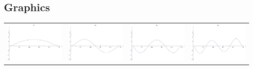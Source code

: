 \documentclass{article}
\begin{document}
\begin{landscape}
\subsection{Graphics}
\begin{tabular}{cccc}
\includegraphics[width=5.0cm]{nonic_bspline_1.pdf}& \includegraphics[width=5.0cm]{nonic_bspline_2.pdf}& \includegraphics[width=5.0cm]{nonic_bspline_3.pdf}& \includegraphics[width=5.0cm]{nonic_bspline_4.pdf} \\

\end{tabular}
\end{landscape}
\end{document}
